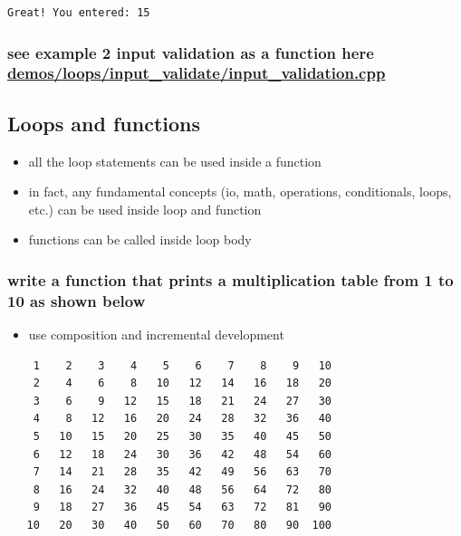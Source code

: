 \documentclass[11pt]{article}
\providecommand{\tightlist}{%
      \setlength{\itemsep}{0pt}\setlength{\parskip}{0pt}}
\begin{document}
    \begin{Verbatim}[commandchars=\\\{\}]
Great! You entered: 15
    \end{Verbatim}

    \hypertarget{see-example-2-input-validation-as-a-function-here-demosloopsinput_validateinput_validation.cpp}{%
\subsubsection{\texorpdfstring{see example 2 input validation as a
function here
\url{demos/loops/input_validate/input_validation.cpp}}{see example 2 input validation as a function here demos/loops/input\_validate/input\_validation.cpp}}\label{see-example-2-input-validation-as-a-function-here-demosloopsinput_validateinput_validation.cpp}}

\hypertarget{loops-and-functions}{%
\subsection{Loops and functions}\label{loops-and-functions}}

\begin{itemize}
\tightlist
\item
  all the loop statements can be used inside a function
\item
  in fact, any fundamental concepts (io, math, operations, conditionals,
  loops, etc.) can be used inside loop and function
\item
  functions can be called inside loop body
\end{itemize}

    \hypertarget{write-a-function-that-prints-a-multiplication-table-from-1-to-10-as-shown-below}{%
\subsubsection{write a function that prints a multiplication table from
1 to 10 as shown
below}\label{write-a-function-that-prints-a-multiplication-table-from-1-to-10-as-shown-below}}

\begin{itemize}
\tightlist
\item
  use composition and incremental development
\end{itemize}

\begin{verbatim}
    1    2    3    4    5    6    7    8    9   10
    2    4    6    8   10   12   14   16   18   20
    3    6    9   12   15   18   21   24   27   30
    4    8   12   16   20   24   28   32   36   40
    5   10   15   20   25   30   35   40   45   50
    6   12   18   24   30   36   42   48   54   60
    7   14   21   28   35   42   49   56   63   70
    8   16   24   32   40   48   56   64   72   80
    9   18   27   36   45   54   63   72   81   90
   10   20   30   40   50   60   70   80   90  100
\end{verbatim}
\end{document}
